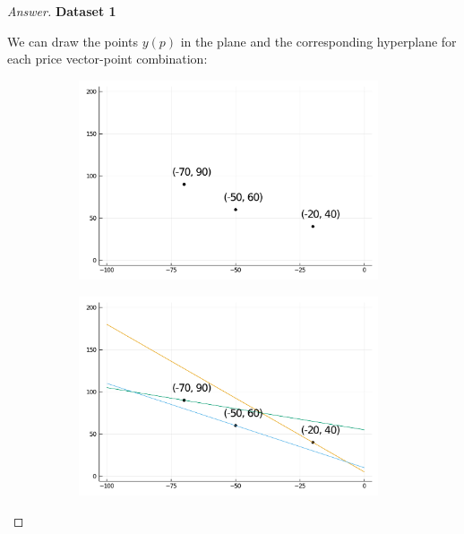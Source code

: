 \documentclass{article}
\theoremstyle{definition}
\begin{document}
\begin{proof}[Answer]
\textbf{Dataset 1}

We can draw the points $y(p)$ in the plane and the corresponding hyperplane for each price vector-point combination:

\begin{figure}[!tbp]
  \centering
  \begin{subfigure}{0.45\textwidth}
    \includegraphics[width=0.97\textwidth]{Problem Set 1 Files/y_i_1.pdf}
  \end{subfigure}
  \hfill
  \begin{subfigure}{0.45\textwidth}
    \includegraphics[width=0.97\textwidth]{Problem Set 1 Files/y_o_1.pdf}
  \end{subfigure}
\end{figure}




\end{proof}
\end{document}
